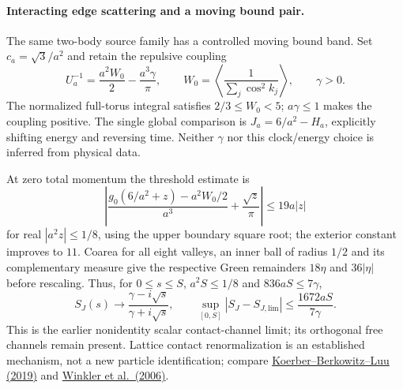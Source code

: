 \paragraph{Interacting edge scattering and a moving bound pair.}
The same two-body source family has a controlled moving bound band.
Set $c_a=\sqrt3/a^2$ and retain the repulsive coupling
\[
 U_a^{-1}=\frac{a^2W_0}{2}-\frac{a^3\gamma}{\pi},\qquad
 W_0=\left\langle\frac1{\sum_j\cos^2k_j}\right\rangle,
 \qquad \gamma>0.
\]
The normalized full-torus integral satisfies $2/3\leq W_0<5$;
$a\gamma\leq1$ makes the coupling positive.  The single global
comparison is $J_a=6/a^2-H_a$, explicitly shifting energy and reversing
time.  Neither $\gamma$ nor this clock/energy choice is inferred from
physical data.

At zero total momentum the threshold estimate is
\[
 \left|\frac{g_0(6/a^2+z)-a^2W_0/2}{a^3}
       +\frac{\sqrt z}{\pi}\right|\leq19a|z|
\]
for real $|a^2z|\leq1/8$, using the upper boundary square root;
the exterior constant improves to $11$.  Coarea for all eight valleys,
an inner ball of radius $1/2$ and its complementary measure give the
respective Green remainders $18\eta$ and $36|\eta|$ before rescaling.
Thus, for $0\leq s\leq S$, $a^2S\leq1/8$ and $836aS\leq7\gamma$,
\[
 S_J(s)\longrightarrow\frac{\gamma-i\sqrt s}{\gamma+i\sqrt s},
 \qquad
 \sup_{[0,S]}|S_J-S_{J,\mathrm{lim}}|
       \leq\frac{1672aS}{7\gamma}.
\]
This is the earlier nonidentity scalar contact-channel limit; its
orthogonal free channels remain present.  Lattice contact renormalization
is an established mechanism, not a new particle identification; compare
\href{https://arxiv.org/abs/1912.04425}{Koerber--Berkowitz--Luu (2019)}
and \href{https://arxiv.org/abs/cond-mat/0605196}{Winkler et al.\ (2006)}.

